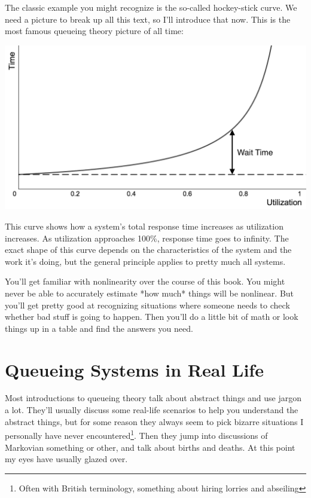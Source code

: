 \documentclass{vivid_layout_pdf}
\begin{document}
The classic example you might recognize is the so-called hockey-stick curve. We need a picture to break up all this text, so I'll introduce that now. This is the most famous queueing theory picture of all time:

\begin{center}
\includegraphics[width=.75\linewidth]{queueing-theory/hockey-stick-1}
\end{center}

This curve shows how a system's total response time increases as utilization increases. As utilization approaches 100\%, response time goes to infinity. The exact shape of this curve depends on the characteristics of the system and the work it's doing, but the general principle applies to pretty much all systems.

You'll get familiar with nonlinearity over the course of this book. You might never be able to accurately estimate *how much* things will be nonlinear. But you'll get pretty good at recognizing situations where someone needs to check whether bad stuff is going to happen. Then you'll do a little bit of math or look things up in a table and find the answers you need.

\section{Queueing Systems in Real Life}	%

Most introductions to queueing theory talk about abstract things and use jargon a lot. They'll usually discuss some real-life scenarios to help you understand the abstract things, but for some reason they always seem to pick bizarre situations I personally have never encountered\footnote{Often with British terminology, something about hiring lorries and abseiling}. Then they jump into discussions of Markovian something or other, and talk about births and deaths. At this point my eyes have usually glazed over.
\end{document}
